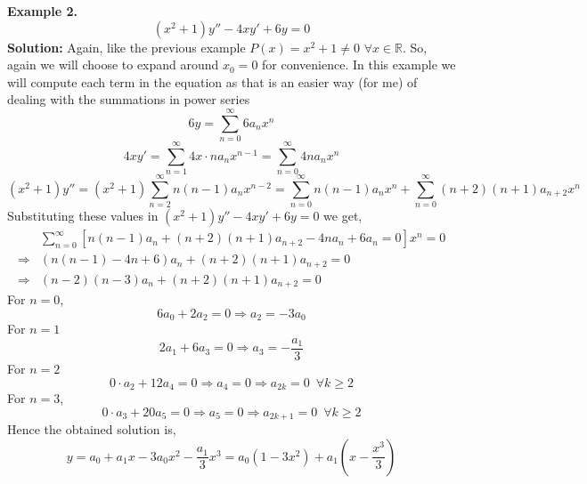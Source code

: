 \documentclass[10pt]{article}
\begin{document}
        \textbf{Example 2.} \\
        $$(x^2 + 1)y'' - 4xy' + 6y = 0$$
        \textbf{Solution: }Again, like the previous example $P(x) = x^2 + 1 \neq 0 \,\, \forall x \in \mathbb{R}$. So, again we will choose to expand around $x_0 = 0$ for convenience. In this example we will compute each term in the equation as that is an easier way (for me) of dealing with the summations in power series 
        $$6y = \sum_{n=0}^\infty 6a_n x^n $$
    	$$4xy' = \sum_{n=1}^\infty 4x\cdot na_nx^{n-1} = \sum_{n=0}^\infty 4na_nx^n$$
    	$$(x^2 + 1)y'' = (x^2 + 1)\sum_{n=2}^\infty n(n-1)a_nx^{n-2} = \sum_{n=0}^\infty n(n-1)a_nx^n + \sum_{n=0}^\infty (n+2)(n+1)a_{n+2}x^n$$
	    Substituting these values in $(x^2 + 1)y'' - 4xy' + 6y = 0$ we get, 
    	\begin{align*}
    		&\sum_{n=0}^\infty [n(n-1)a_n + (n+2)(n+1)a_{n+2} - 4na_n + 6a_n = 0 ]x^n = 0 \\
    		\Rightarrow &(n(n-1)-4n+6)a_n + (n+2)(n+1)a_{n+2} = 0 \\
    		\Rightarrow &(n-2)(n-3)a_n + (n+2)(n+1)a_{n+2} = 0
        \end{align*}
        For $n=0$,
        $$6a_0 + 2a_2 = 0 \Rightarrow a_2 = -3a_0$$
        For $n = 1$
        $$2a_1 + 6a_3 = 0 \Rightarrow a_3 = -\frac{a_1}{3}$$
        For $n = 2$
        $$0\cdot a_2 + 12a_4 = 0 \Rightarrow a_4 = 0 \Rightarrow a_{2k} = 0 \,\,\, \forall k \geq 2$$
        For $n = 3$,
        $$0\cdot a_3 + 20a_5 = 0 \Rightarrow a_5 = 0 \Rightarrow a_{2k+1} = 0 \,\,\, \forall k \geq 2$$
        Hence the obtained solution is, 
        $$y = a_0 + a_1x -3a_0x^2 -\frac{a_1}{3}x^3 = a_0(1 - 3x^2) + a_1 \left(x - \frac{x^3}{3}\right)$$
\end{document}
